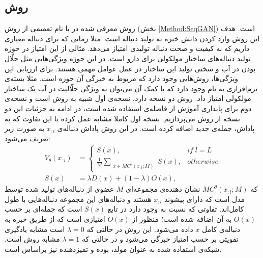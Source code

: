 \subsection{ روش }
 روش معرفی شده در
 \cite{ORGAN}
با نام
 تعمیمی از روش
 (بخش 
 \ref{Method:SeqGAN})
 است. هدف این روش وارد کردن دانش خبره به تولید دنباله است. مثلا زمانی که برای دنباله معیاری داریم که به کیفیت و صحت دنباله تولیدی امتیاز می‌دهد. مثالی از این امتیاز در حوزه تولید دنباله‌های ساختار مولکولی  برای دارو است. در این حوزه ویژگی‌هایی مثل حلّال بودن در آب و سختی تولید این ساختار در عمل عوامل مهمی هستند. برای ارزیابی این ویژگی‌ها، روش‌هایی وجود دارد که مربوط به خبرگی آن حوزه است. مثلا بسته‌ی نرم‌افزاری به نام
 وجود دارد که با کمک آن می‌توان به ویژگی حلّالیت در آب یک ساختار مولکولی امتیاز داد.
 \newline
 روش 
دو نسخه دارد، نسخه‌ی اول شبیه به روش
است و نسخه‌ی دوم برای پایداری آموزش از فاصله‌ی
استفاده شده است، در ادامه به جزئیات این دو نسخه از روش می‌پردازیم.
\newline
نسخه اول کاملا مشابه 
عمل کرده با این تفاوت که به پاداش، جمله‌ی جدید اضافه کرده است. در این روش پاداش دنباله‌ی
$x_{:l}$
به صورت زیر تعریف می‌شود:
\begin{equation}\label{Eqauation:Method:ORGAN:RewardDefine}
\begin{split}
 V_\theta(x_{:l}) &= 
\begin{cases}
S(x)  ,&   if \; l = L\\
\frac{1}{M} \sum_{\substack{x \in MC^{\theta}(x_{:l}; M)}} S(x) ,&  otherwise
\end{cases} \\
S(x) &= \lambda D(x) + (1- \lambda) O(x),
\end{split}
\end{equation}
که
$MC^{\theta}(x_{:l}; M)$
نشان دهنده‌ی مجموعه‌ای $M$ عضوی از دنباله‌های تولید شده توسط مدل است که دارای پیشوند
$x_{:l}$
هستند و دنباله‌های این مجموعه دنباله‌هایی با طول کامل‌اند. تفاوتی که نسبت به
وجود دارد در تابع $S(x)$ است که جمله‌ای بر حسب $O(x)$ به آن اضافه شده است؛ منظور از $O(x)$ امتیازی است که از طریق خبره به دنباله‌ی کامل $x$ داده می‌شود.
این روش در حالتی که 
$\lambda = 0 $
است مشابه‌ یادگیری تقویتی بر حسب امتیاز خبرگی می‌شود و در حالتی که
$\lambda = 1 $
مشابه روش
است.
\newline
شبکه‌ی استفاده شده به عنوان مولد،
بوده و تمیزدهنده نیز براساس
است.
